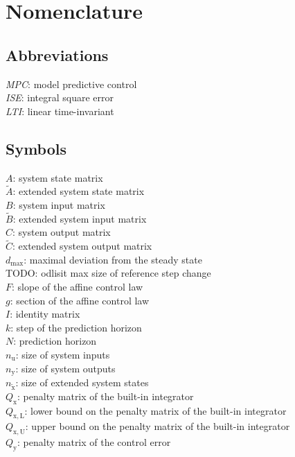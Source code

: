 \documentclass[preprint,12pt]{elsarticle}
\begin{document}
\section*{Nomenclature}

\subsection{Abbreviations}
\noindent  \textit{MPC}: model predictive control \\
\textit{ISE}: integral square error \\
\textit{LTI}: linear time-invariant \\

\subsection{Symbols}
\noindent $A$: system state matrix \\
$\widetilde{A}$: extended system state matrix \\
$B$: system input matrix \\
$\widetilde{B}$: extended system input matrix \\
$C$: system output matrix \\
$\widetilde{C}$: extended system output matrix \\
$d_{\max}$: maximal deviation from the steady state \\
TODO: odlisit max size of reference step change \\
$F$: slope of the affine control law \\
$g$: section of the affine control law \\
$I$: identity matrix \\	
$k$: step of the prediction horizon \\
$N$: prediction horizon \\
$n_{\mathrm{u}}$: size of system inputs \\
$n_{\mathrm{y}}$: size of system outputs \\
$n_{\widetilde{\mathrm{x}}}$: size of extended system states \\
$Q_{\mathrm{x}}$: penalty matrix of the built-in integrator \\
$Q_{\mathrm{x,L}}$: lower bound on the penalty matrix of the built-in integrator \\
$Q_{\mathrm{x,U}}$: upper bound on the penalty matrix of the built-in integrator \\
$Q_{\mathrm{y}}$: penalty matrix of the control error \\
\end{document}
